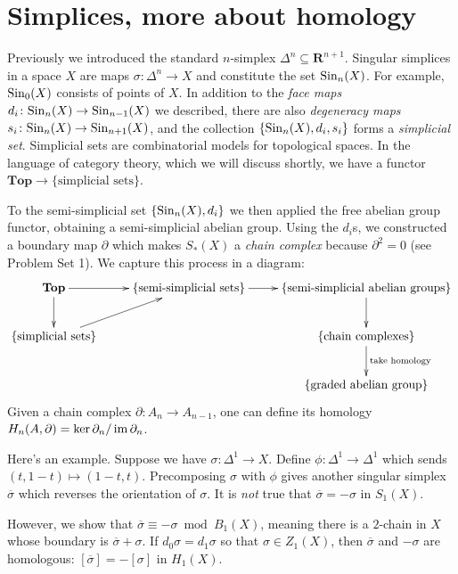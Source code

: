 
\section{Simplices, more about homology}
Previously we introduced the standard $n$-simplex $\Delta^n\subseteq\mathbf{R}^{n+1}$. Singular simplices in a space $X$ are maps $\sigma\colon\Delta^n\to X$ and constitute the set $\mathrm{Sin}_n(X)$. For example, $\mathrm{Sin}_0(X)$ consists of points of $X$. In addition to the \emph{face maps} $d_i\colon\mathrm{Sin}_n(X)\to\mathrm{Sin}_{n-1}(X)$ we described, there are also \emph{degeneracy maps} $s_i\colon\mathrm{Sin}_n(X)\to\mathrm{Sin}_{n+1}(X)$, and the collection $\{\mathrm{Sin}_n(X),d_i,s_i\}$ forms a \emph{simplicial set}. Simplicial sets are combinatorial models for topological spaces. In the language of category theory, which we will discuss shortly, we have a functor $\mathbf{Top}\to\{\text{simplicial sets}\}$.

To the semi-simplicial set $\{\mathrm{Sin}_n(X),d_i\}$ we then applied the free abelian group functor, obtaining a semi-simplicial abelian group. Using the $d_i$s, we constructed a boundary map $\partial$ which makes $S_\ast(X)$ a \emph{chain complex} because $\partial^2=0$ (see Problem Set 1). We capture this process in a diagram:
\begin{equation*}
\xymatrix{\mathbf{Top}\ar[d]\ar[r] & \{\text{semi-simplicial sets}\}\ar[r] & \{\text{semi-simplicial abelian groups}\}\ar[d]\\
    \{\text{simplicial sets}\}\ar[ur] & & \{\text{chain complexes}\}\ar[d]^{\text{take homology}}\\
 & &\{\text{graded abelian group}\}}
\end{equation*}
Given a chain complex $\partial\colon A_n\to A_{n-1}$, one can define its homology $H_n(A,\partial)=\ker\partial_n/\operatorname{im}\partial_n$.

Here's an example. Suppose we have $\sigma\colon \Delta^1\to X$. Define $\phi\colon\Delta^1\to\Delta^1$ which sends $(t,1-t)\mapsto (1-t,t)$. Precomposing $\sigma$ with $\phi$ gives another singular simplex $\overline{\sigma}$ which reverses the orientation of $\sigma$. It is \textit{not} true that $\overline{\sigma}=-\sigma$ in $S_1(X)$.

However, we show that $\overline{\sigma}\equiv -\sigma\bmod B_1(X)$, meaning there is a $2$-chain in $X$ whose boundary is $\overline{\sigma}+\sigma$. If $d_0\sigma=d_1\sigma$ so that $\sigma\in Z_1(X)$, then $\overline{\sigma}$ and $-\sigma$ are homologous: $[\overline{\sigma}]=-[\sigma]$ in $ H_1(X)$.

